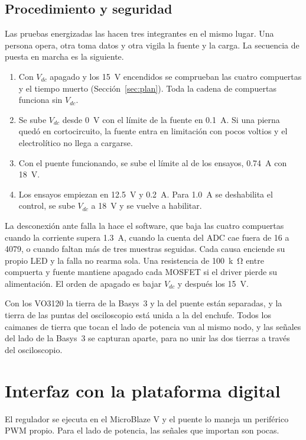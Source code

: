 \documentclass[journal]{IEEEtran}
\begin{document}
\subsection{Procedimiento y seguridad}
\label{sec:seguridad}
Las pruebas energizadas las hacen tres integrantes en el mismo lugar. Una persona opera, otra toma datos y otra vigila la fuente y la carga. La secuencia de puesta en marcha es la siguiente.

\begin{enumerate}
	\item Con $V_{dc}$ apagado y los \SI{15}{V} encendidos se comprueban las cuatro compuertas y el tiempo muerto (Sección~\ref{sec:plan}). Toda la cadena de compuertas funciona sin $V_{dc}$.
	\item Se sube $V_{dc}$ desde \SI{0}{V} con el límite de la fuente en \SI{0.1}{A}. Si una pierna quedó en cortocircuito, la fuente entra en limitación con pocos voltios y el electrolítico no llega a cargarse.
	\item Con el puente funcionando, se sube el límite al de los ensayos, \SI{0.74}{A} con \SI{18}{V}.
	\item Los ensayos empiezan en \SI{12.5}{V} y \SI{0.2}{A}. Para \SI{1.0}{A} se deshabilita el control, se sube $V_{dc}$ a \SI{18}{V} y se vuelve a habilitar.
\end{enumerate}

La desconexión ante falla la hace el software, que baja las cuatro compuertas cuando la corriente supera \SI{1.3}{A}, cuando la cuenta del ADC cae fuera de \num{16} a \num{4079}, o cuando faltan más de tres muestras seguidas. Cada causa enciende su propio LED y la falla no rearma sola. Una resistencia de \SI{100}{k\ohm} entre compuerta y fuente mantiene apagado cada MOSFET si el driver pierde su alimentación. El orden de apagado es bajar $V_{dc}$ y después los \SI{15}{V}.

Con los VO3120 la tierra de la Basys~3 y la del puente están separadas, y la tierra de las puntas del osciloscopio está unida a la del enchufe. Todos los caimanes de tierra que tocan el lado de potencia van al mismo nodo, y las señales del lado de la Basys~3 se capturan aparte, para no unir las dos tierras a través del osciloscopio.

\section{Interfaz con la plataforma digital}
\label{sec:interfaz}
El regulador se ejecuta en el MicroBlaze V y el puente lo maneja un periférico PWM propio. Para el lado de potencia, las señales que importan son pocas.
\end{document}
